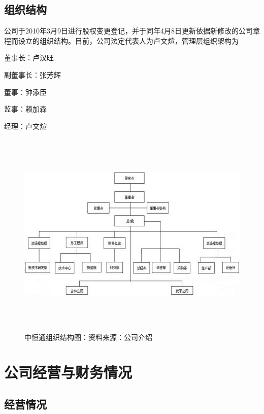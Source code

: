 \subsection{组织结构}{}
公司于2010年3月9日进行股权变更登记，并于同年4月8日更新依据新修改的公司章程而设立的组织结构。目前，公司法定代表人为卢文煊，管理层组织架构为
\begin{compactitem}
\item 董事长：卢汉旺
\item 副董事长：张芳辉
\item 董事：钟添臣
\item 监事：赖加森
\item 经理：卢文煊 
\end{compactitem}
  \begin{figure}%
   \includegraphics[width=15cm,height=10cm]{figures/org}
   \caption{中恒通组织结构图：{\footnotesize 资料来源：公司介绍}}
  \end{figure}
 
\section{公司经营与财务情况}{}
\subsection{经营情况}{}

